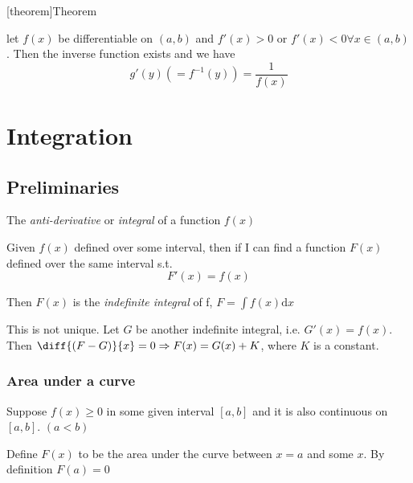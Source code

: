 \documentclass[12pt]{report}
\theoremstyle{definition}
\begin{document}
[theorem]{Theorem}
\begin{derivative of inverse f}
    let $f(x)$ be differentiable on $(a,b)$
    and $f'(x) > 0$ or $f'(x) < 0 \forall x \in (a,b)$.
    Then the inverse function exists and we have\[
        g'(y) ( = f^{-1}(y) ) = \frac{1}{f(x)}
    \]
\end{derivative of inverse f}




\chapter{Integration}
\section{Preliminaries}
    The \emph{anti-derivative} or \emph{integral} of a function $f(x)$
    
    Given $f(x)$ defined over some interval, then if I can find a function $F(x)$ defined over the same interval
    s.t. \[F'(x) = f(x)\]

    Then $F(x)$ is the \emph{indefinite integral} of f, $F = \int f(x) \mathrm{d}x$

    This is not unique.
    Let $G$ be another indefinite integral, i.e. $G'(x) = f(x)$. Then $\diff {(F-G)}{x} = 0 \Rightarrow F(x)=G(x)+K$, 
    where $K$ is a constant.

\subsection{Area under a curve}
Suppose $f(x)\ge0$ in some given interval $[a,b]$ and it is also continuous on $[a,b]$. $(a<b)$ 

Define $F(x)$ to be the area under the curve between $x=a$ and some $x$. By definition $F(a)=0$
\end{document}
